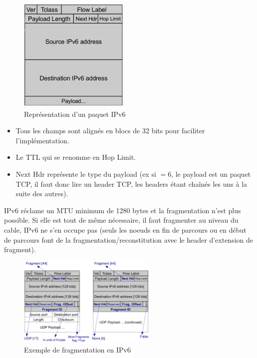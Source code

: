 \documentclass{article}
\begin{document}
\begin{sffamily}
\begin{figure}[h!]
    \begin{center}
    \includegraphics[width=200px]{img_003.pdf}
    \caption{Représentation d'un paquet IPv6}
    \end{center}	
\end{figure}

\begin{itemize}
\item Tous les champs sont alignés en blocs de 32 bits pour faciliter l'implémentation.
\item Le TTL qui se renomme en Hop Limit.
\item Next Hdr représente le type du payload (ex si $=6$, le payload est un paquet TCP, il faut donc lire un header TCP, les 
headers étant chaînés les uns à la suite des autres). \\
\end{itemize}

IPv6 réclame un MTU minimum de 1280 bytes et la fragmentation n'est plus possible. Si elle est tout de même nécessaire, il faut 
fragmenter au niveau du cable, IPv6 ne s'en occupe pas (seuls les noeuds en fin de parcours ou en début de parcours font de la
fragmentation/reconstitution avec le header d'extension de fragment).

\begin{figure}[h!]
    \begin{center}
    \includegraphics[width=250px]{img_004.pdf}
    \caption{Exemple de fragmentation en IPv6}
    \end{center}	
\end{figure}


\end{sffamily}
\end{document}
